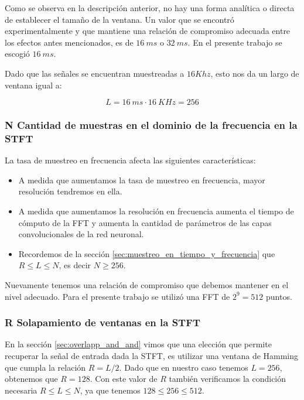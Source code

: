 Como se observa en la descripción anterior, no hay una forma analítica o directa de establecer el tamaño de la ventana. Un valor que se encontró experimentalmente y que mantiene una relación de compromiso adecuada entre los efectos antes mencionados, es de $\SI{16}{ms}$ o $\SI{32}{ms}$. En el presente trabajo se escogió $\SI{16}{ms}$.

Dado que las señales se encuentran muestreadas a $16 Khz$, esto nos da un largo de ventana igual a:

\begin{equation*}
	L = \SI{16}{ms} \cdot \SI{16}{KHz} = 256
\end{equation*}

\subsubsection{N Cantidad de muestras en el dominio de la frecuencia en la STFT}
\label{sec:cantidad_muestras_frecuencia}

La tasa de muestreo en frecuencia afecta las siguientes características:

\begin{itemize}
	\item A medida que aumentamos la tasa de muestreo en frecuencia, mayor resolución tendremos en ella.
	\item A medida que aumentamos la resolución en frecuencia aumenta el tiempo de cómputo de la FFT y aumenta la cantidad de parámetros de las capas convolucionales de la red neuronal.
	\item Recordemos de la sección \ref{sec:muestreo_en_tiempo_y_frecuencia} que $R \leq L \leq N$, es decir $N \ge 256$.
\end{itemize}

Nuevamente tenemos una relación de compromiso que debemos mantener en el nivel adecuado. Para el presente trabajo se utilizó una FFT de $2^{9} = 512$ puntos. 

\subsubsection{R Solapamiento de ventanas en la STFT}

En la sección \ref{sec:overlapp_and_and} vimos que una elección que permite recuperar la señal de entrada dada la STFT, es utilizar una ventana de Hamming que cumpla la relación $R = L/2$. Dado que en nuestro caso tenemos $L = 256$, obtenemos que $R=128$. Con este valor de $R$ también verificamos la condición necesaria $R \leq L \leq N$, ya que tenemos $128 \leq 256 \leq 512$.

